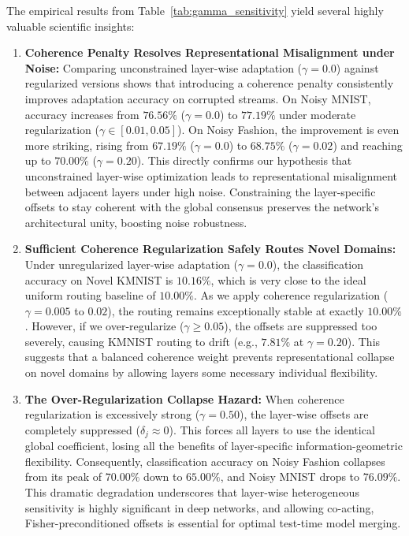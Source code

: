 \documentclass{article}
\theoremstyle{plain}
\theoremstyle{definition}
\theoremstyle{remark}
\begin{document}
The empirical results from Table~\ref{tab:gamma_sensitivity} yield several highly valuable scientific insights:
\begin{enumerate}
  \item \textbf{Coherence Penalty Resolves Representational Misalignment under Noise:} Comparing unconstrained layer-wise adaptation ($\gamma=0.0$) against regularized versions shows that introducing a coherence penalty consistently improves adaptation accuracy on corrupted streams. On Noisy MNIST, accuracy increases from $76.56\%$ ($\gamma=0.0$) to $77.19\%$ under moderate regularization ($\gamma \in [0.01, 0.05]$). On Noisy Fashion, the improvement is even more striking, rising from $67.19\%$ ($\gamma=0.0$) to $68.75\%$ ($\gamma=0.02$) and reaching up to $70.00\%$ ($\gamma=0.20$). This directly confirms our hypothesis that unconstrained layer-wise optimization leads to representational misalignment between adjacent layers under high noise. Constraining the layer-specific offsets to stay coherent with the global consensus preserves the network's architectural unity, boosting noise robustness.
  \item \textbf{Sufficient Coherence Regularization Safely Routes Novel Domains:} Under unregularized layer-wise adaptation ($\gamma=0.0$), the classification accuracy on Novel KMNIST is $10.16\%$, which is very close to the ideal uniform routing baseline of $10.00\%$. As we apply coherence regularization ($\gamma = 0.005$ to $0.02$), the routing remains exceptionally stable at exactly $10.00\%$. However, if we over-regularize ($\gamma \ge 0.05$), the offsets are suppressed too severely, causing KMNIST routing to drift (e.g., $7.81\%$ at $\gamma=0.20$). This suggests that a balanced coherence weight prevents representational collapse on novel domains by allowing layers some necessary individual flexibility.
  \item \textbf{The Over-Regularization Collapse Hazard:} When coherence regularization is excessively strong ($\gamma = 0.50$), the layer-wise offsets are completely suppressed ($\delta_j \approx 0$). This forces all layers to use the identical global coefficient, losing all the benefits of layer-specific information-geometric flexibility. Consequently, classification accuracy on Noisy Fashion collapses from its peak of $70.00\%$ down to $65.00\%$, and Noisy MNIST drops to $76.09\%$. This dramatic degradation underscores that layer-wise heterogeneous sensitivity is highly significant in deep networks, and allowing co-acting, Fisher-preconditioned offsets is essential for optimal test-time model merging.
\end{enumerate}
\end{document}
